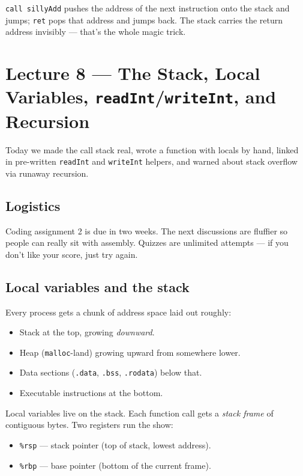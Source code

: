\documentclass[11pt]{article}
\begin{document}
\texttt{call sillyAdd} pushes the address of the next instruction
onto the stack and jumps; \texttt{ret} pops that address and jumps
back. The stack carries the return address invisibly --- that's the
whole magic trick.

\section{Lecture 8 --- The Stack, Local Variables, \texttt{readInt}/\texttt{writeInt}, and Recursion}

Today we made the call stack real, wrote a function with locals by
hand, linked in pre-written \texttt{readInt} and \texttt{writeInt}
helpers, and warned about stack overflow via runaway recursion.

\subsection*{Logistics}

Coding assignment 2 is due in two weeks. The next discussions are
fluffier so people can really sit with assembly. Quizzes are
unlimited attempts --- if you don't like your score, just try
again.

\subsection*{Local variables and the stack}

Every process gets a chunk of address space laid out roughly:
\begin{itemize}
  \item Stack at the top, growing \emph{downward}.
  \item Heap (\texttt{malloc}-land) growing upward from somewhere
    lower.
  \item Data sections (\texttt{.data}, \texttt{.bss},
    \texttt{.rodata}) below that.
  \item Executable instructions at the bottom.
\end{itemize}
Local variables live on the stack. Each function call gets a
\emph{stack frame} of contiguous bytes. Two registers run the show:
\begin{itemize}
  \item \texttt{\%rsp} --- stack pointer (top of stack, lowest
    address).
  \item \texttt{\%rbp} --- base pointer (bottom of the current
    frame).
\end{itemize}
\end{document}
